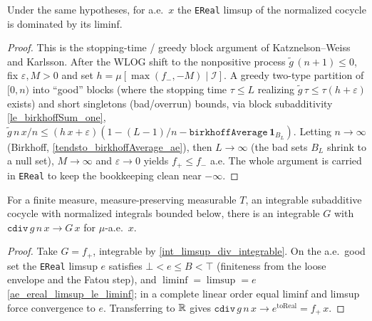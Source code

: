 \begin{proposition}\label{ae_ereal_limsup_le_liminf}
  \leanok
  Under the same hypotheses, for a.e.\ \(x\) the \texttt{EReal} limsup of the
  normalized cocycle is dominated by its liminf.
\end{proposition}
\begin{proof}\leanok
  This is the stopping-time / greedy block argument of Katznelson--Weiss and
  Karlsson. After the WLOG shift to the nonpositive process \(\tilde g\,(n+1)
  \le 0\), fix \(\varepsilon, M > 0\) and set \(h = \mu[\max(f_-, -M) \mid
  \mathcal I]\). A greedy two-type partition of \([0,n)\) into ``good'' blocks
  (where the stopping time \(\tau \le L\) realizing \(\tilde g\,\tau \le
  \tau(h+\varepsilon)\) exists) and short singletons (bad/overrun) bounds, via
  block subadditivity \cref{le_birkhoffSum_one},
  \(\tilde g\,n\,x/n \le (h\,x+\varepsilon)(1 - (L-1)/n -
  \texttt{birkhoffAverage}\,\mathbf 1_{B_L})\). Letting \(n \to \infty\)
  (Birkhoff, \cref{tendsto_birkhoffAverage_ae}), then \(L \to \infty\) (the bad
  sets \(B_L\) shrink to a null set), \(M \to \infty\) and \(\varepsilon \to 0\)
  yields \(f_+ \le f_-\) a.e. The whole argument is carried in \texttt{EReal} to
  keep the bookkeeping clean near \(-\infty\).
\end{proof}

\begin{theorem}\label{ae_tendsto_cdiv}
  \leanok
  For a finite measure, measure-preserving measurable \(T\), an integrable
  subadditive cocycle with normalized integrals bounded below, there is an
  integrable \(G\) with \(\texttt{cdiv}\,g\,n\,x \to G\,x\) for \(\mu\)-a.e.\
  \(x\).
\end{theorem}
\begin{proof}\leanok
  Take \(G = f_+\), integrable by \cref{int_limsup_div_integrable}. On the
  a.e.\ good set the \texttt{EReal} limsup \(e\) satisfies \(\bot < e \le B <
  \top\) (finiteness from the loose envelope and the Fatou step), and
  \(\liminf = \limsup = e\) \cref{ae_ereal_limsup_le_liminf}; in a complete
  linear order equal liminf and limsup force convergence to \(e\). Transferring
  to \(\mathbb{R}\) gives \(\texttt{cdiv}\,g\,n\,x \to e^{\text{toReal}} = f_+\,x\).
\end{proof}

